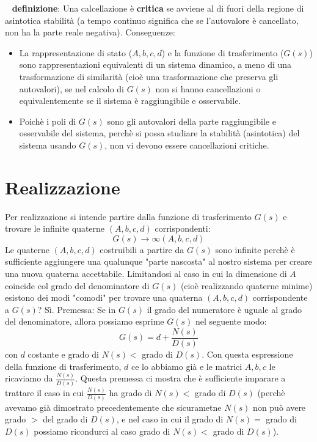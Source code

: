 \ \newline
\textbf{definizione}:  Una calcellazione è \textbf{critica} se avviene al di fuori della regione di asintotica stabilità (a tempo continuo significa che se l'autovalore è cancellato, non ha la parte reale negativa).
\newline
\newline
Conseguenze:
\begin{itemize}
    \item La rappresentazione di stato ($A,b,c,d$) e la funzione di trasferimento ($G(s)$) sono rappresentazioni equivalenti di un sistema dinamico, a meno di una trasformazione di similarità (cioè una trasformazione che preserva gli autovalori), se nel calcolo di $G(s)$ non si hanno cancellazioni o equivalentemente se il sistema è raggiungibile e osservabile.
    \item Poichè i poli di $G(s)$ sono gli autovalori della parte raggiungibile e osservabile del sistema, perchè si possa studiare la stabilità (asintotica) del sistema usando $G(s)$, non vi devono essere cancellazioni critiche.
\end{itemize}
\newpage
\section{Realizzazione}
Per realizzazione si intende partire dalla funzione di trasferimento $G(s)$ e trovare le infinite quaterne $(A,b,c,d)$ corrispondenti: 
\[
    G(s) \rightarrow \infty(A,b,c,d)
\]
Le quaterne $(A,b,c,d)$ costruibili a partire da $G(s)$ sono infinite perchè è sufficiente aggiungere una qualunque "parte nascosta" al nostro sistema per creare una nuova quaterna accettabile.\newline
\newline
Limitandosi al caso in cui la dimensione di $A$ coincide col grado del denominatore di $G(s)$ (cioè realizzando quaterne minime) esistono dei modi "comodi" per trovare una quaterna $(A,b,c,d)$ corrispondente a $G(s)$? Sì.\newline
\newline
Premessa: Se in $G(s)$ il grado del numeratore è uguale al grado del denominatore, allora possiamo esprime $G(s)$ nel seguente modo:
\[
    G(s) = d + \frac{N(s)}{D(s)}
\]
con $d$ costante e grado di $N(s) <$ grado di $D(s)$.\newline
Con questa espressione della funzione di trasferimento, $d$ ce lo abbiamo già e le matrici $A,b,c$ le ricaviamo da $\frac{N(s)}{D(s)}$.\newline
\newline
Questa premessa ci mostra che è sufficiente imparare a trattare il caso in cui $\frac{N(s)}{D(s)}$ ha grado di $N(s) <$ grado di $D(s)$ (perchè avevamo già dimostrato precedentemente che sicurametne $N(s)$ non può avere grado $>$ del grado di $D(s)$, e nel caso in cui il grado di $N(s) = $ grado di $D(s)$ possiamo ricondurci al caso grado di $N(s) <$ grado di $D(s)$).
